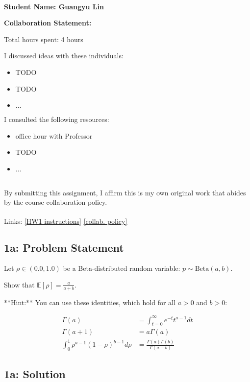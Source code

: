 \documentclass[10pt]{article}
\newcommand{\officialdirections}[1]{{\color{purple} #1}}
\begin{document}
~~\\ %

{\Large{\bf Student Name: Guangyu Lin}}

\Large{\bf Collaboration Statement:}

Total hours spent: 4 hours

I discussed ideas with these individuals:
\begin{itemize}
\item TODO
\item TODO
\item $\ldots$	
\end{itemize}

I consulted the following resources:
\begin{itemize}
\item office hour with Professor
\item TODO
\item $\ldots$	
\end{itemize}
~~\\
By submitting this assignment, I affirm this is my own original work that abides by the course collaboration policy.
~~\\
~~\\
Links: 
\href{https://www.cs.tufts.edu/cs/136/2023s/hw1.html}{[HW1 instructions]} 
\href{https://www.cs.tufts.edu/cs/136/2023s/index.html#collaboration}{[collab. policy]} 

\tableofcontents

\newpage

\officialdirections{
\subsection*{1a: Problem Statement}

Let $\rho \in (0.0, 1.0)$ be a Beta-distributed random variable: $p \sim \text{Beta}(a, b)$. 

Show that $\mathbb{E}[ \rho ] = \frac{a}{a + b}$.

**Hint:** You can use these identities, which hold for all $a > 0$ and $b > 0$:

\begin{align}
\Gamma(a) &= \int_{t=0}^{\infty} e^{-t} t^{a-1} dt
\\
\Gamma(a+1) &= a \Gamma(a)
\\
\int_{0}^1 \rho^{a-1} (1-\rho)^{b-1} d\rho &= \frac{\Gamma(a)\Gamma(b)}{\Gamma(a+b)}
\end{align}
}

\subsection{1a: Solution}
\end{document}
